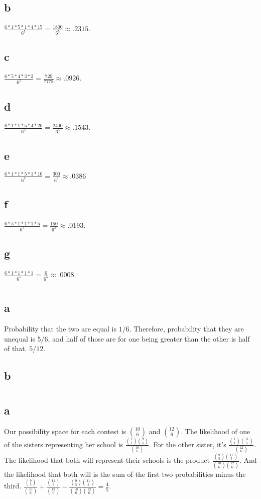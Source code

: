 \documentclass[12pt]{article}
\begin{document}
\subsection*{b}
\(\frac{6*1*5*1*4*15}{6^5} = \frac{1800}{6^5} \approx .2315\).
\subsection*{c}
\(\frac{6*5*4*3*2}{6^5} = \frac{720}{7778} \approx .0926\).
\subsection*{d}
\(\frac{6*1*1*5*4*20}{6^5} = \frac{2400}{6^5} \approx .1543\).
\subsection*{e}
\(\frac{6*1*1*5*1*10}{6^5} = \frac{300}{6^5} \approx .0386\)
\subsection*{f}
\(\frac{6*5*1*1*1*5}{6^5} = \frac{150}{6^5} \approx .0193\).
\subsection*{g}
\(\frac{6*1*1*1*1}{6^5} = \frac{6}{6^5} \approx .0008\).
\section{}
\subsection*{a}
Probability that the two are equal is \(1/6\). Therefore, probability that they are unequal is \(5/6\), and half of those are for one being greater than the other is half of that. \(5/12\).
\subsection*{b}

\section{}
\subsection*{a}
Our possibility space for each contest is \(\binom{10}{6}\) and \(\binom{12}{6}\).
The likelihood of one of the sisters representing her school is \(\frac{\binom{1}{1}\binom{9}{5}}{\binom{10}{6}}\). For the other sister, it's \(\frac{\binom{1}{1}\binom{11}{5}}{\binom{12}{6}}\). The likelihood that both will represent their schools is the product \(\frac{\binom{9}{5}\binom{11}{5}}{\binom{10}{6}\binom{12}{6}}\). And the likelihood that both will is the sum of the first two probabilities minus the third. \(\frac{\binom{9}{5}}{\binom{10}{6}}+\frac{\binom{11}{5}}{\binom{12}{6}}-\frac{\binom{9}{5}\binom{11}{5}}{\binom{10}{6}\binom{12}{6}}=\frac{4}{5}\).
\end{document}
